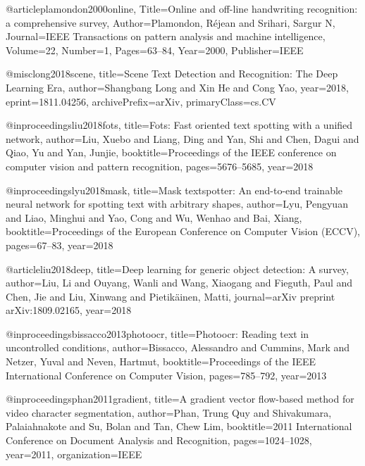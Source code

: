 @article{plamondon2000online,
	Title={Online and off-line handwriting recognition: a comprehensive survey},
	Author={Plamondon, R{\'e}jean and Srihari, Sargur N},
	Journal={IEEE Transactions on pattern analysis and machine intelligence},
	Volume={22},
	Number={1},
	Pages={63--84},
	Year={2000},
	Publisher={IEEE}
}

@misc{long2018scene,
    title={Scene Text Detection and Recognition: The Deep Learning Era},
    author={Shangbang Long and Xin He and Cong Yao},
    year={2018},
    eprint={1811.04256},
    archivePrefix={arXiv},
    primaryClass={cs.CV}
}

@inproceedings{liu2018fots,
  title={Fots: Fast oriented text spotting with a unified network},
  author={Liu, Xuebo and Liang, Ding and Yan, Shi and Chen, Dagui and Qiao, Yu and Yan, Junjie},
  booktitle={Proceedings of the IEEE conference on computer vision and pattern recognition},
  pages={5676--5685},
  year={2018}
}

@inproceedings{lyu2018mask,
  title={Mask textspotter: An end-to-end trainable neural network for spotting text with arbitrary shapes},
  author={Lyu, Pengyuan and Liao, Minghui and Yao, Cong and Wu, Wenhao and Bai, Xiang},
  booktitle={Proceedings of the European Conference on Computer Vision (ECCV)},
  pages={67--83},
  year={2018}
}

@article{liu2018deep,
  title={Deep learning for generic object detection: A survey},
  author={Liu, Li and Ouyang, Wanli and Wang, Xiaogang and Fieguth, Paul and Chen, Jie and Liu, Xinwang and Pietik{\"a}inen, Matti},
  journal={arXiv preprint arXiv:1809.02165},
  year={2018}
}

@inproceedings{bissacco2013photoocr,
  title={Photoocr: Reading text in uncontrolled conditions},
  author={Bissacco, Alessandro and Cummins, Mark and Netzer, Yuval and Neven, Hartmut},
  booktitle={Proceedings of the IEEE International Conference on Computer Vision},
  pages={785--792},
  year={2013}
}

@inproceedings{phan2011gradient,
  title={A gradient vector flow-based method for video character segmentation},
  author={Phan, Trung Quy and Shivakumara, Palaiahnakote and Su, Bolan and Tan, Chew Lim},
  booktitle={2011 International Conference on Document Analysis and Recognition},
  pages={1024--1028},
  year={2011},
  organization={IEEE}
}